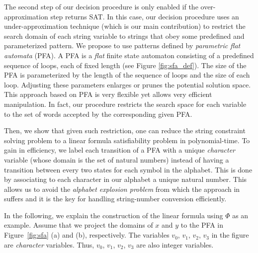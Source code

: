 \documentclass[sigplan,screen]{acmart}
\begin{document}
The second step of our decision procedure is only enabled if the over-approximation step returns SAT. In this case, our decision procedure uses an under-approximation technique (which is  our main contribution) to restrict the search domain of each string variable to strings that obey some predefined and parameterized pattern.  We propose to use patterns defined by \emph{parametric flat automata} (PFA). A PFA is a {\em flat} finite state automaton consisting of a predefined sequence of loops, each of fixed length (see Figure \ref{fig:sfa_def}). The size of the PFA is parameterized by the length of the sequence of loops and the size of each loop. Adjusting these parameters enlarges or prunes the potential solution space. This approach based on PFA is very flexible yet allows very efficient manipulation. In fact, our procedure restricts the search space for each variable to the set of words accepted by the corresponding given PFA. 


Then, we show that given such restriction, one can  reduce the string constraint solving problem to a linear formula satisfiability problem in polynomial-time. To gain in efficiency, we label each transition  of a PFA with a unique \emph{character} variable (whose domain is the set of natural numbers) instead of having a transition between every two states for each symbol in the alphabet.  This is done by associating to each character in our alphabet a unique natural number. This allows us to avoid the \textit{alphabet explosion problem} from which the approach in~\cite{abdulla2017flatten} suffers and it is  the key for handling string-number conversion efficiently. 


In the following, we explain the construction of the linear formula using $\Phi$ as an example. Assume that we project the domains of $x$ and $y$ to the PFA in Figure~\ref{fig:sfa} (a) and (b), respectively. The variables $v_0$, $v_1$, $v_2$, $v_3$ in the figure are \emph{character} variables. Thus, $v_0$, $v_1$, $v_2$, $v_3$ are also integer variables. 

\end{document}
